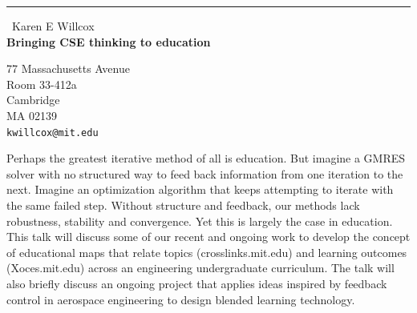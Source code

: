 \documentclass{report}
\begin{document}
\begin{center}
\rule{6in}{1pt} \
{\large Karen E Willcox \\
{\bf Bringing CSE thinking to education }}

77 Massachusetts Avenue \\ Room 33-412a \\ Cambridge \\ MA 02139
\\
{\tt kwillcox@mit.edu}\end{center}

Perhaps the greatest iterative method of all is education. But imagine a
GMRES solver with no structured way to feed back information from one
iteration to the next. Imagine an optimization algorithm that keeps
attempting to iterate with the same failed step. Without structure and
feedback, our methods lack robustness, stability and convergence. Yet
this is largely the case in education. This talk will discuss some of our
recent and ongoing work to develop the concept of educational maps that
relate topics (crosslinks.mit.edu) and learning outcomes (Xoces.mit.edu)
across an engineering undergraduate curriculum. The talk will also
briefly discuss an ongoing project that applies ideas inspired by
feedback control in aerospace engineering to design blended learning
technology.
\end{document}
